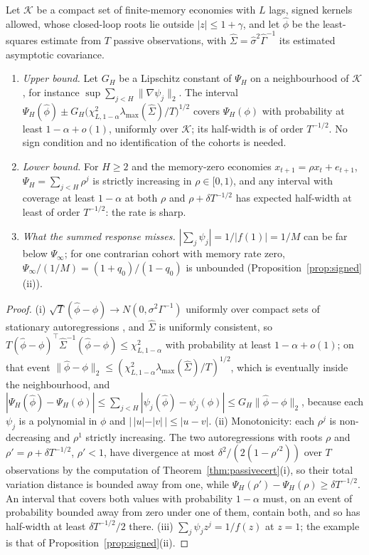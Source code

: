 \begin{theorem}\label{thm:absresp}
Let $\mathcal K$ be a compact set of finite-memory economies with $L$ lags, signed kernels allowed, whose closed-loop roots lie outside $|z|\le1+\gamma$, and let $\hat\phi$ be the least-squares estimate from $T$ passive observations, with $\hat\Sigma=\hat\sigma^2\hat\Gamma^{-1}$ its estimated asymptotic covariance.
\begin{enumerate}[label=(\roman*)]
\item \emph{Upper bound.} Let $G_H$ be a Lipschitz constant of $\Psi_H$ on a neighbourhood of $\mathcal K$, for instance $\sup\sum_{j<H}\|\nabla\psi_j\|_2$. The interval $\Psi_H(\hat\phi)\pm G_H\big(\chi^2_{L,1-\alpha}\lambda_{\max}(\hat\Sigma)/T\big)^{1/2}$ covers $\Psi_H(\phi)$ with probability at least $1-\alpha+o(1)$, uniformly over $\mathcal K$; its half-width is of order $T^{-1/2}$. No sign condition and no identification of the cohorts is needed.
\item \emph{Lower bound.} For $H\ge2$ and the memory-zero economies $x_{t+1}=\rho x_t+e_{t+1}$, $\Psi_H=\sum_{j<H}\rho^j$ is strictly increasing in $\rho\in[0,1)$, and any interval with coverage at least $1-\alpha$ at both $\rho$ and $\rho+\delta T^{-1/2}$ has expected half-width at least of order $T^{-1/2}$: the rate is sharp.
\item \emph{What the summed response misses.} $|\sum_j\psi_j|=1/|f(1)|=1/M$ can be far below $\Psi_\infty$; for one contrarian cohort with memory rate zero, $\Psi_\infty/(1/M)=(1+q_0)/(1-q_0)$ is unbounded (Proposition~\ref{prop:signed}(ii)).
\end{enumerate}
\hfill\Proved
\end{theorem}

\begin{proof}
(i) $\sqrt T(\hat\phi-\phi)\to N(0,\sigma^2\Gamma^{-1})$ uniformly over compact sets of stationary autoregressions \citep{t:mannwald1943,t:mikusheva2007}, and $\hat\Sigma$ is uniformly consistent, so $T(\hat\phi-\phi)^\top\hat\Sigma^{-1}(\hat\phi-\phi)\le\chi^2_{L,1-\alpha}$ with probability at least $1-\alpha+o(1)$; on that event $\|\hat\phi-\phi\|_2\le(\chi^2_{L,1-\alpha}\lambda_{\max}(\hat\Sigma)/T)^{1/2}$, which is eventually inside the neighbourhood, and $|\Psi_H(\hat\phi)-\Psi_H(\phi)|\le\sum_{j<H}|\psi_j(\hat\phi)-\psi_j(\phi)|\le G_H\|\hat\phi-\phi\|_2$, because each $\psi_j$ is a polynomial in $\phi$ and $|\,|u|-|v|\,|\le|u-v|$. (ii) Monotonicity: each $\rho^j$ is non-decreasing and $\rho^1$ strictly increasing. The two autoregressions with roots $\rho$ and $\rho'=\rho+\delta T^{-1/2}$, $\rho'<1$, have divergence at most $\delta^2/(2(1-\rho'^2))$ over $T$ observations by the computation of Theorem~\ref{thm:passivecert}(i), so their total variation distance is bounded away from one, while $\Psi_H(\rho')-\Psi_H(\rho)\ge\delta T^{-1/2}$. An interval that covers both values with probability $1-\alpha$ must, on an event of probability bounded away from zero under one of them, contain both, and so has half-width at least $\delta T^{-1/2}/2$ there. (iii) $\sum_j\psi_jz^j=1/f(z)$ at $z=1$; the example is that of Proposition~\ref{prop:signed}(ii).
\end{proof}

